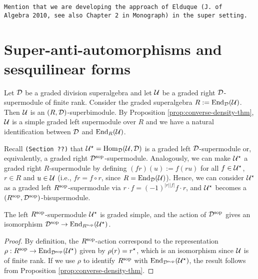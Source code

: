 \documentclass{amsbook}
\begin{document}
{\tt Mention that we are developing the approach of Elduque (J. of \\Al\-ge\-bra 2010, see also Chapter 2 in Monograph) in the super setting.}


\section{Super-anti-automorphisms and sesquilinear forms}

Let $\mathcal{D}$ be a graded division superalgebra and let $\mathcal U$ be a graded right $\mathcal{D}$-supermodule of finite rank. 
Consider the graded superalgebra $R := \operatorname{End}_{\mathcal{D}}(\mathcal U)$. 
Then $\mathcal U$ is an $(R, \mathcal{D})$-superbimodule. 
By Proposition \ref{prop:converse-density-thm}, $\mathcal U$ is a simple graded left supermodule over $R$ and we have a natural identification between $\mathcal{D}$ and $\operatorname{End}_R(\mathcal U)$.

Recall {\tt (Section ??)} that $\mathcal U^\star = \operatorname{Hom}_{\mathcal{D}} (\mathcal U, \mathcal{D})$ is a graded left $\mathcal{D}$-supermodule or, equivalently, a graded right $\mathcal{D}^{\mathrm{sop}}$-supermodule. 
Analogously, we can make $\mathcal U^\star$ a graded right $R$-supermodule by defining $(f r) (u) := f(r u)$ for all $f\in \mathcal U^\star$, $r\in R$ and $u\in \mathcal U$ (i.e., $f r = f \circ r$, since $R = \operatorname{End}_{\mathcal{D}}(\mathcal U)$). 
Hence, we can consider $\mathcal U^\star$ as a graded left $R^{\mathrm{sop}}$-supermodule via $r\cdot f = (-1)^{|r||f|} f\cdot r$, %
and $\mathcal U^\star$ becomes a $(R^{\mathrm{sop}}, \mathcal{D}^{\mathrm{sop}})$-bisupermodule.

\begin{lemma}\label{lemma:U-star-R-sop}
    The left $R^{\mathrm{sop}}$-supermodule $\mathcal U^\star$ is graded simple, and the action of $\mathcal{D}^{\mathrm{sop}}$ gives an isomorphism $\mathcal{D}^{\mathrm{sop}} \to \operatorname{End}_{R^{\mathrm{sop}}}(\mathcal U^\star)$.
\end{lemma}

\begin{proof}
    By definition, the $R^{\mathrm{sop}}$-action correspond to the representation $\rho: R^{\mathrm{sop}} \to \operatorname{End}_{\mathcal{D}^{\mathrm{sop}}} (\mathcal U^\star)$ given by $ \rho(r) = r^\star$, which is an isomorphism since $\mathcal U$ is of finite rank. 
    If we use $\rho$ to identify $R^{\mathrm{sop}}$ with $\operatorname{End}_{\mathcal{D}^{\mathrm{sop}}} (\mathcal U^\star)$, the result follows from Proposition \ref{prop:converse-density-thm}.
\end{proof}

\end{document}
